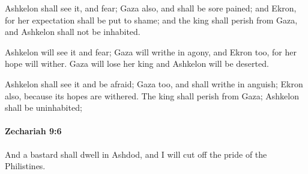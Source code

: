 			\begin{versebox}
					\item[BHS] 
					\item[LXX] 
					\item[ASV] Ashkelon shall see it, and fear; Gaza also, and shall be sore pained; and Ekron, for her expectation shall be put to shame; and the king shall perish from Gaza, and Ashkelon shall not be inhabited.
					\item[NIV] Ashkelon will see it and fear; Gaza will writhe in agony, and Ekron too, for her hope will wither. Gaza will lose her king and Ashkelon will be deserted.
					\item[NRSV] Ashkelon shall see it and be afraid; Gaza too, and shall writhe in anguish; Ekron also, because its hopes are withered. The king shall perish from Gaza; Ashkelon shall be uninhabited;
			\end{versebox}

		\paragraph{Zechariah 9:6} %
			\label{ZECHARIAH-9-6}

			And a bastard shall dwell in Ashdod, and I will cut off the pride of the Philistines.

